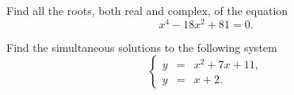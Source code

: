 \documentclass[12pt]{amsart}
\begin{document}
\newpage
\begin{thm}[18 Points]\label{ex9}
  Find all the roots, both real and complex, of the equation
  $$x^4 - 18x^2 + 81 = 0.$$
  \vspace{3in}
\end{thm}

\begin{thm}[18 Points]\label{ex9}
  Find the simultaneous solutions to the following system
  $$\left\{\begin{array}{rcl}
    y &=& x^2 + 7x + 11,\\
    y &=& x + 2.
  \end{array}\right.$$
  \vspace{2in}
\end{thm}
\end{document}

